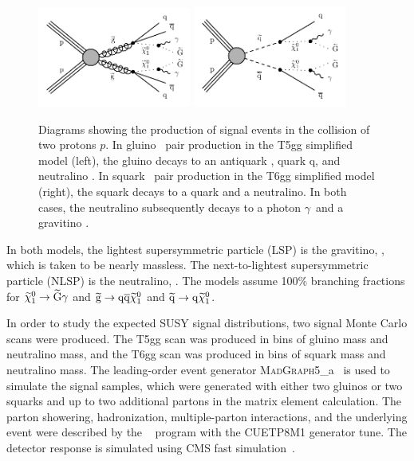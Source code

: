 \begin{figure}[htbp]
    \centering
    \includegraphics[width=0.45\textwidth]{Figures/Results/gluinoDecay.pdf}
    \includegraphics[width=0.45\textwidth]{Figures/Results/squarkDecay.pdf}
    \caption{Diagrams showing the production of signal events in the collision
        of two protons $p$. In gluino
        \gluino~pair production in the T5gg simplified model (left), the gluino
       decays to an antiquark \antiquark, quark q, and neutralino \neutralino. In
        squark \squark~pair production in the T6gg simplified model (right), the
        squark decays to a quark and a neutralino. In both cases, the
        neutralino subsequently decays to a photon $\gamma$~and a gravitino \gravitino.
        }
    \label{fig:gluinoSquarkDecay}
\end{figure}

In both models, the lightest supersymmetric particle (LSP) is the gravitino, \gravitino, which is taken to be nearly massless. The next-to-lightest supersymmetric particle (NLSP) is the neutralino, \neutralino. The models assume 100\% branching fractions for 
$\widetilde{\chi}^{0}_{1}\rightarrow\widetilde{\mathrm{G}}\gamma$ and 
$\widetilde{\mathrm{g}}\rightarrow \mathrm{q} \overline{\mathrm{q}} \widetilde{\chi}^{0}_{1}$ and 
$\widetilde{\mathrm{q}}\rightarrow \mathrm{q} \widetilde{\chi}^{0}_{1}$.

In order to study the expected SUSY signal distributions, two
signal Monte Carlo scans were produced.
The T5gg scan was produced in bins of gluino mass and neutralino mass,
and the T6gg scan was produced in bins of squark mass and neutralino mass.
The leading-order event generator \textsc{MadGraph}5\_a\MCATNLO~\cite{Alwall:2014hca}
is used to simulate the signal samples, which
were generated with either two gluinos or two squarks and up to two additional
partons in the matrix element calculation. The parton showering, hadronization,
multiple-parton interactions, and the underlying event were described by the
~\cite{Sjostrand:2007gs} program with the CUETP8M1 generator tune.
The detector response is simulated using
CMS fast simulation~\cite{Abdullin:2011zz}.

